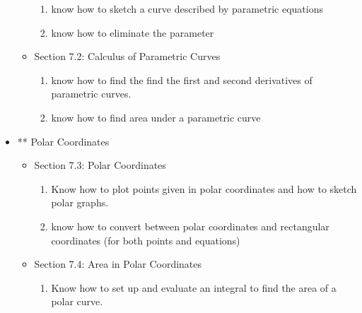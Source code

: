 \documentclass[11pt,fleqn]{article}
\begin{document}
\begin{itemize}
\begin{itemize}
		\begin{enumerate}
		\item know how to sketch a curve described by parametric equations
		\item know how to eliminate the parameter
		\end{enumerate}
		
	\item Section 7.2: Calculus of Parametric Curves
	
		\begin{enumerate}
		\item know how to find the find the first and second derivatives of parametric curves.
		\item know how to find area under a parametric curve
		\end{enumerate}
	\end{itemize}
		
\item ** Polar Coordinates

	\begin{itemize}
	\item Section 7.3: Polar Coordinates
		\begin{enumerate}
		\item Know how to plot points given in polar coordinates and how to sketch polar graphs.
		\item know how to convert between polar coordinates and rectangular coordinates (for both points and equations)
		\end{enumerate}
	
	\item Section 7.4: Area in Polar Coordinates
		\begin{enumerate}
		\item Know how to set up and evaluate an integral to find the area of a polar curve.
		\end{enumerate}
		
	\end{itemize}
	
\end{itemize}
\end{document}
